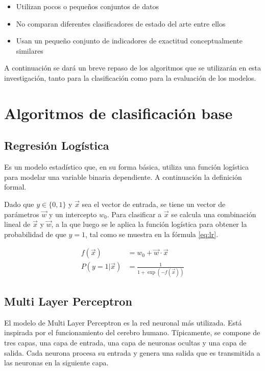 \begin{itemize}
    \item Utilizan pocos o pequeños conjuntos de datos
    \item No comparan diferentes clasificadores de estado del arte entre ellos
    \item Usan un pequeño conjunto de indicadores de exactitud conceptualmente similares
\end{itemize}

A continuación se dará un breve repaso de los algoritmos que se utilizarán en esta investigación, tanto para la clasificación como para la evaluación de los modelos.

\section{Algoritmos de clasificación base}

\subsection{Regresión Logística}

Es un modelo estadístico que, en su forma básica, utiliza una función logística para modelar una variable binaria dependiente. A continuación la definición formal.

Dado que $y\in \{0, 1\}$ y $\vec{x}$ sea el vector de entrada, se tiene un vector de parámetros $\vec{w}$ y un intercepto $w_0$. Para clasificar a $\vec{x}$ se calcula una combinación lineal de $\vec{x}$ y $\vec{w}$, a la que luego se le aplica la función logística para obtener la probabilidad de que $y = 1$, tal como se muestra en la fórmula \ref{eq:lr}.

\begin{equation}
    \label{eq:lr}
\begin{split}
    f(\vec{x}) &= w_0 + \vec{w}\cdot\vec{x} \\
    P(y=1|\vec{x}) &= \frac{1}{1 + \exp(-f(\vec{x})) }
\end{split}
\end{equation}

\subsection{Multi Layer Perceptron}

El modelo de Multi Layer Perceptron es la red neuronal más utilizada. Está inspirada por el funcionamiento del cerebro humano. Típicamente, se compone de tres capas, una capa de entrada, una capa de neuronas ocultas y una capa de salida. Cada neurona procesa su entrada y genera una salida que es transmitida a las neuronas en la siguiente capa.


